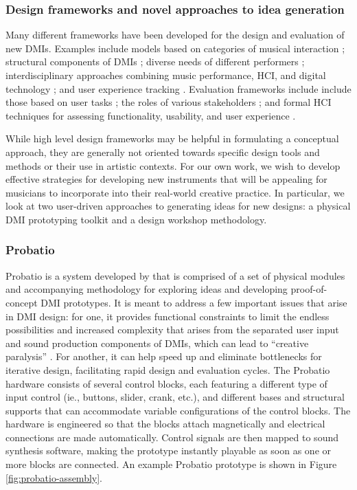 \documentclass[letterpaper, 12pt]{article}
\begin{document}
\subsubsection{Design frameworks and novel approaches to idea generation}
\label{sec:design-frameworks}

Many different frameworks have been developed for the design and evaluation of new DMIs. Examples include models based on categories of musical interaction \citep{Bongers2000a}; structural components of DMIs \citep{Wanderley2004}; diverse needs of different performers \citep{Jorda2004, Jorda2004b}; interdisciplinary approaches combining music performance, HCI, and digital technology \citep{Overholt2009}; and user experience tracking \citep{fmorreale:2014}. Evaluation frameworks include include those based on user tasks \citep{Wanderley2002}; the roles of various stakeholders \citep{OModhrain2011a}; and formal HCI techniques for assessing functionality, usability, and user experience \citep{Young2015a}.

While high level design frameworks may be helpful in formulating a conceptual approach, they are generally not oriented towards specific design tools and methods or their use in artistic contexts. For our own work, we wish to develop effective strategies for developing new instruments that will be appealing for musicians to incorporate into their real-world creative practice. In particular, we look at two user-driven approaches to generating ideas for new designs: a physical DMI prototyping toolkit and a design workshop methodology. 

\subsubsection{Probatio}
\label{sec:probatio}

Probatio is a system developed by \citet{Calegario2017} that is comprised of a set of physical modules and accompanying methodology for exploring ideas and developing proof-of-concept DMI prototypes. It is meant to address a few important issues that arise in DMI design: for one, it provides functional constraints to limit the endless possibilities and increased complexity that arises from the separated user input and sound production components of DMIs, which can lead to ``creative paralysis'' \citep{Magnusson2010}. For another, it can help speed up and eliminate bottlenecks for iterative design, facilitating rapid design and evaluation cycles. The Probatio hardware consists of several control blocks, each featuring a different type of input control (ie., buttons, slider, crank, etc.), and different bases and structural supports that can accommodate variable configurations of the control blocks. The hardware is engineered so that the blocks attach magnetically and electrical connections are made automatically. Control signals are then mapped to sound synthesis software, making the prototype instantly playable as soon as one or more blocks are connected. An example Probatio prototype is shown in Figure \ref{fig:probatio-assembly}.
\end{document}
